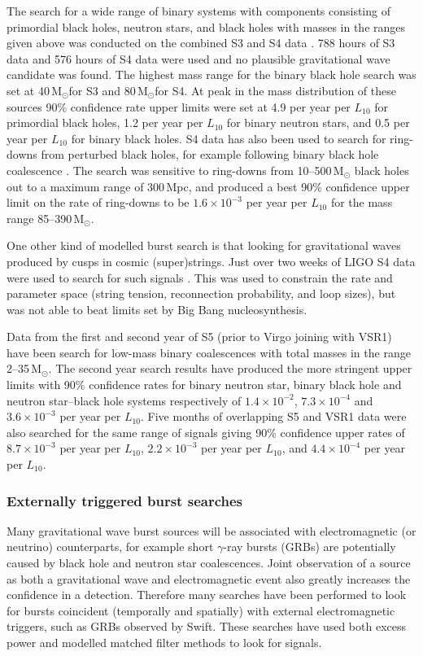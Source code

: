 \documentclass{article}
\newcommand{\Msun}{\,M$_{\odot}$}
\begin{document}
The search for a wide range of binary systems with components consisting of
primordial black holes, neutron stars, and black holes with masses in
the ranges given above was conducted on the combined S3 and S4 data
\cite{Abbott:2008a}. 788 hours of S3 data and 576 hours of S4 data were used
and no plausible gravitational wave candidate was found. The highest mass range
for the binary black hole search was set at 40\Msun for S3 and 80\Msun for S4.
At peak in the mass distribution of these sources 90\% confidence rate upper
limits were set at 4.9 per year per $L_{10}$ for primordial black holes, 1.2 per
year per $L_{10}$ for binary neutron stars, and 0.5 per year per $L_{10}$ for
binary black holes. S4 data has also been used to search for ring-downs from
perturbed black holes, for example following binary black hole coalescence
\cite{Abbott:2009g}. The search was sensitive to ring-downs from
10--500\,M$_{\odot}$ black holes out to a maximum range of 300\,Mpc, and
produced a best 90\% confidence upper limit on the rate of ring-downs to be
$1.6\times10^{-3}$ per year per $L_{10}$ for the mass range
85--390\,M$_{\odot}$.

One other kind of modelled burst search is that looking for gravitational waves
produced by cusps in cosmic (super)strings. Just over two weeks of LIGO S4 data
were used to search for such signals \cite{Abbott:2009j}. This was used to
constrain the rate and parameter space (string tension, reconnection
probability, and loop sizes), but was not able to beat limits set by Big Bang
nucleosynthesis.

Data from the first \cite{Abbott:2009e} and second year of S5 (prior to Virgo
joining with VSR1) \cite{Abbott:2009f} have been search for low-mass binary
coalescences with total masses in the range 2--35\,M$_{\odot}$. The second
year search results have produced the more stringent upper limits with 90\%
confidence rates for binary neutron star, binary black hole and
neutron star--black hole systems respectively of $1.4\times10^{-2}$,
$7.3\times10^{-4}$ and $3.6\times10^{-3}$ per year per $L_{10}$. Five months of
overlapping S5 and VSR1 data were also searched for the same range of signals 
\cite{Abadie:2010f} giving 90\% confidence upper rates of $8.7\times10^{-3}$ per year per $L_{10}$, 
$2.2\times10^{-3}$ per year per $L_{10}$, and $4.4\times10^{-4}$ per year per $L_{10}$.

\subsubsection{Externally triggered burst searches}
Many gravitational wave burst sources will be associated with 
electromagnetic (or neutrino) counterparts, for example short $\gamma$-ray 
bursts (GRBs) are potentially caused by black hole and neutron star coalescences.
Joint observation of a source as both a gravitational wave and electromagnetic
event also greatly increases the confidence in a detection. Therefore many 
searches have been performed to look for bursts coincident (temporally and 
spatially) with external 
electromagnetic triggers, such as GRBs observed by Swift. These searches have
used both excess power and modelled matched filter methods to look for signals.
\end{document}
